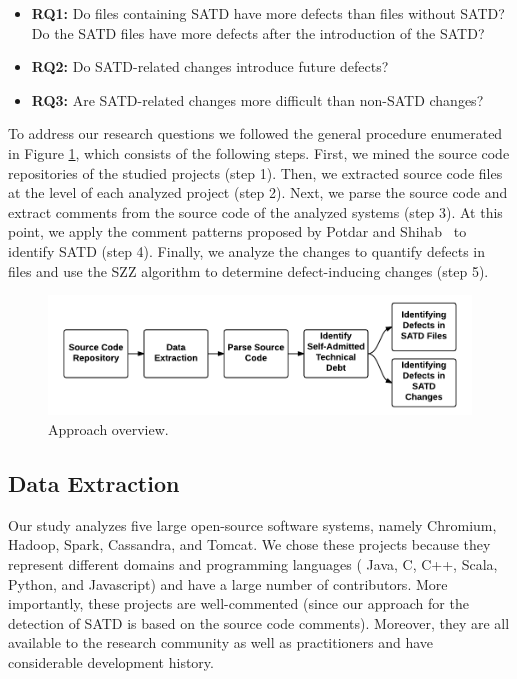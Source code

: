 \begin{itemize}
	\vspace{0.2cm}
	\item {\bf RQ1:} Do files containing SATD have more defects than files without SATD? Do the SATD files have more defects after the introduction of the SATD?\\
	\item {\bf RQ2:} Do SATD-related changes introduce future defects?\\
	\item {\bf RQ3:} Are SATD-related changes more difficult than non-SATD changes?
\end{itemize}


To address our research questions we followed the general procedure enumerated in Figure \ref{fig:Process_overview}, which consists of the following steps. First, we mined the source code repositories of the studied projects (step 1). Then, we extracted  source code files at the level of each analyzed project (step 2). Next, we parse the source code and extract comments from the source code of the analyzed systems (step 3). At this point, we apply the comment patterns proposed by Potdar and Shihab~\cite{ICSM_PotdarS14} to identify SATD (step 4). Finally, we analyze the changes to quantify defects in files and use the SZZ algorithm to determine defect-inducing changes (step 5).


\begin{figure}[t]
	\centering
	\includegraphics[width=150mm]{figures/chapter3/approach}
	\caption{Approach overview.}
	\label{fig:Process_overview}
\end{figure}


\subsection{Data Extraction}
Our study analyzes five large open-source software systems, namely Chromium, Hadoop, Spark, Cassandra, and Tomcat. We chose these projects because they represent different domains and programming languages (\ie{} Java, C, C++,  Scala, Python, and Javascript) and have a large number of contributors. More importantly, these projects are well-commented (since our approach for the detection of SATD is based on the source code comments). Moreover, they are all available to the research community as well as practitioners and have considerable development history.

